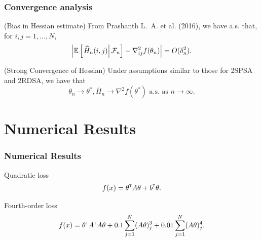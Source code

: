 \begin{frame}
\begin{small}
\frametitle{\centering Convergence analysis}

\begin{lemma}(\alert{Bias in Hessian estimate})
\label{lemma:2rdsa-bias}
From Prashanth L.~A. et al. (2016)\footnotemark[1], we have a.s. that\footnotemark[2], for $i,j = 1,\ldots,N$,
\begin{align}
\left|\mathbb{E}\left[
\left. \widehat H_n(i,j) \right| \mathcal{F}_n \right] - \nabla^2_{ij} f(\theta_n)\right| = O(\delta_n^2).
\end{align} 
\end{lemma}
\begin{theorem}(\alert{Strong Convergence of Hessian})
\label{thm:2rdsa-H}
Under assumptions similar to those for 2SPSA and 2RDSA, we have that 
$$\theta_n \rightarrow \theta^*, \overline H_n \rightarrow \nabla^2 f(\theta^*) \text{ a.s. as } n\rightarrow \infty.$$ 
\end{theorem}
\end{small}
\end{frame}



\section{Numerical Results}
\begin{frame}
\begin{small}
\frametitle{\centering Numerical Results}
\begin{block}{\alert{Quadratic loss}}
\begin{align}
f(x) = \theta^\mathsf{\scriptscriptstyle T} A \theta + b^\mathsf{\scriptscriptstyle T} \theta.\label{eq:quadratic}
\end{align}
\end{block}
\begin{block}{\alert{Fourth-order loss}}
\begin{align} 
f(x) = \theta^\mathsf{\scriptscriptstyle T} A^\mathsf{\scriptscriptstyle T} A \theta + 0.1 \sum_{j=1}^N (A\theta)^3_j + 0.01 \sum_{j=1}^N (A\theta)^4_j.\label{eq:4thorder}
 \end{align} 
 \end{block}
 \end{small}
\end{frame}


